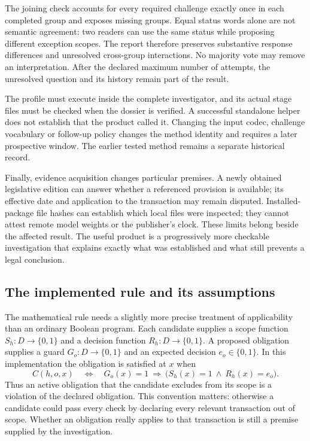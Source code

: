 The joining check accounts for every required challenge exactly once in each
completed group and exposes missing groups. Equal status words alone are not
semantic agreement: two readers can use the same status while proposing
different exception scopes. The report therefore preserves substantive response
differences and unresolved cross-group interactions. No majority vote may remove
an interpretation. After the declared maximum number of attempts, the unresolved
question and its history remain part of the result.

The profile must execute inside the complete investigator, and its actual stage
files must be checked when the dossier is verified. A successful standalone
helper does not establish that the product called it. Changing the input codec,
challenge vocabulary or follow-up policy changes the method identity and
requires a later prospective window. The earlier tested method remains a
separate historical record.

Finally, evidence acquisition changes particular premises. A newly obtained
legislative edition can answer whether a referenced provision is available;
its effective date and application to the transaction may remain disputed.
Installed-package file hashes can establish which local files were inspected;
they cannot attest remote model weights or the publisher's clock. These limits
belong beside the affected result. The useful product is a progressively more
checkable investigation that explains exactly what was established and what
still prevents a legal conclusion.

\subsection{The implemented rule and its assumptions}

The mathematical rule needs a slightly more precise treatment of applicability
than an ordinary Boolean program. Each candidate supplies a scope function
$S_h:D\to\{0,1\}$ and a decision function $R_h:D\to\{0,1\}$. A proposed
obligation supplies a guard $G_o:D\to\{0,1\}$ and an expected decision
$e_o\in\{0,1\}$. In this implementation the obligation is satisfied at $x$ when
\[
 C(h,o,x)\quad\Longleftrightarrow\quad
 G_o(x)=1\ \Longrightarrow\
 \bigl(S_h(x)=1\ \land\ R_h(x)=e_o\bigr).
\]
Thus an active obligation that the candidate excludes from its scope is a
violation of the declared obligation. This convention matters: otherwise a
candidate could pass every check by declaring every relevant transaction out of
scope. Whether an obligation really applies to that transaction is still a
premise supplied by the investigation.

